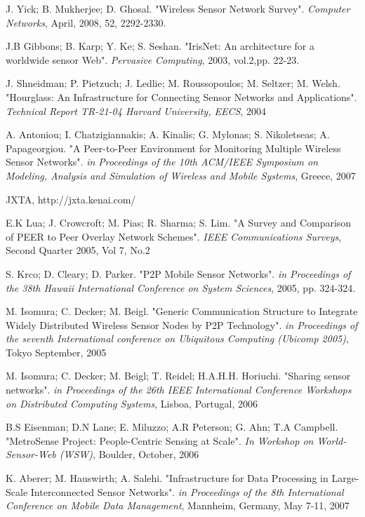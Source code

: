 \documentclass[onecolumn]{jaise2e}
\begin{document}
\begin{thebibliography}{0}
J. Yick; B. Mukherjee; D. Ghosal. "Wireless Sensor Network Survey". {\em Computer Networks}, April, 2008, 52, 2292-2330.

J.B Gibbons; B. Karp; Y. Ke; S. Seshan. "IrisNet: An architecture for a worldwide sensor Web". {\em Pervasive Computing}, 2003, vol.2,pp. 22-23.

J. Shneidman; P. Pietzuch; J. Ledlie; M. Roussopoulos; M. Seltzer; M. Welsh. "Hourglass: An Infrastructure for Connecting Sensor Networks and Applications". {\em Technical Report TR-21-04 Harvard
University, EECS}, 2004

A. Antoniou; I. Chatzigiannakis; A. Kinalis; G. Mylonas; S. Nikoletseas; A. Papageorgiou. "A Peer-to-Peer Environment for Monitoring Multiple Wireless Sensor Networks". {\em in Proceedings of the 10th ACM/IEEE Symposium on Modeling, Analysis and Simulation of Wireless and Mobile Systems}, Greece, 2007

JXTA, http://jxta.kenai.com/

E.K Lua; J. Crowcroft; M. Pias; R. Sharma; S. Lim. "A Survey and Comparison of PEER to Peer Overlay Network Schemes". {\em IEEE Communications Surveys}, Second Quarter 2005, Vol 7, No.2

S. Krco; D. Cleary; D. Parker. "P2P Mobile Sensor Networks". {\em in Proceedings of the 38th Hawaii International Conference on System Sciences}, 2005, pp. 324-324.

M. Isomura; C. Decker; M. Beigl. "Generic Communication Structure to Integrate Widely Distributed Wireless Sensor Nodes by P2P Technology". {\em in
Proceedings of the seventh International conference on
Ubiquitous Computing (Ubicomp 2005)}, Tokyo September, 2005

M. Isomura; C. Decker; M. Beigl; T. Reidel; H.A.H.H. Horiuchi. "Sharing sensor networks". {\em in Proceedings of the 26th IEEE International Conference Workshops on Distributed Computing Systems}, Lisboa, Portugal, 2006

B.S Eisenman; D.N Lane; E. Miluzzo; A.R Peterson; G. Ahn; T.A Campbell. "MetroSense Project: People-Centric Sensing at Scale". {\em In Workshop on World-Sensor-Web (WSW)}, Boulder, October, 2006

K. Aberer; M. Hauswirth; A. Salehi. "Infrastructure for Data Processing in Large-Scale Interconnected Sensor Networks". {\em in Proceedings of the 8th International Conference on Mobile Data Management}, Mannheim, Germany, May 7-11, 2007


\end{thebibliography}
\end{document}
